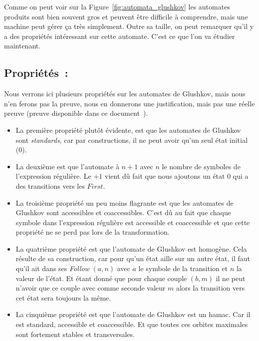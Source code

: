 \vphantom{}

Comme on peut voir sur la Figure~\ref{fig:automata_glushkov} les automates
produits sont bien souvent gros et peuvent être difficile à comprendre, mais
une machine peut gérer ça très simplement. Outre sa taille, on peut remarquer
qu'il y a des propriétés intéressant sur cette automate. C'est ce que l'on va
étudier maintenant.

\subsection{Propriétés~:}

Nous verrons ici plusieurs propriétés sur les automates de Glushkov, mais nous
n'en ferons pas la preuve, nous en donnerons une justification, mais pas une
réelle preuve (preuve disponible dans ce
document~\cite{DBLP:journals/tcs/CaronZ00}).

\vphantom{}

\begin{itemize}[label=\textbullet]
    \item La première propriété plut\^{o}t évidente, est que les automates de Glushkov
          sont \textit{standards}, car par constructions, il ne peut avoir qu'un seul
          état initial (0).

          \vphantom{}

    \item La deuxième est que l'automate à \(n + 1\) avec \(n\) le nombre de symboles de
          l'expression régulière. Le \(+ 1\) vient dû fait que nous ajoutons un état
          \(0\) qui a des transitions vers les \(First\).

          \vphantom{}

    \item La troisième propriété un peu moins flagrante est que les automates de Glushkov
          sont accessibles et coaccessibles. C'est dû au fait que chaque symbole dans
          l'expression régulière est accessible et coaccessible et que cette propriété ne
          se perd pas lors de la transformation.

          \vphantom{}

    \item La quatrième propriété est que l'automate de Glushkov est homogène. Cela
          résulte de sa construction, car pour qu'un état aille sur un autre état, il
          faut qu'il ait dans ses \textit{Follow} \((a, n)\) avec \(a\) le symbole de la
          transition et \(n\) la valeur de l'état. Et étant donné que pour chaque couple
          \((b, m)\) il ne peut n'avoir que ce couple avec comme seconde valeur \(m\)
          alors la transition vers cet état sera toujours la même.

          \vphantom{}

    \item La cinquième propriété est que l'automate de Glushkov est un hamac. Car il est
          standard, accessible et coaccessible. Et que toutes ces orbites maximales sont
          fortement stables et transversales.

          \vphantom{}
\end{itemize}

